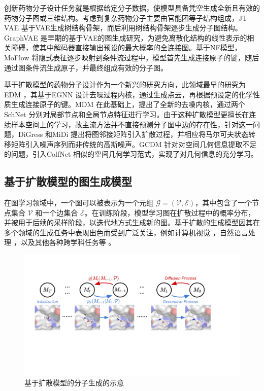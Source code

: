 创新药物分子设计任务就是根据给定分子数据，使模型具备凭空生成全新且有效的药物分子图或三维结构。考虑到复杂药物分子主要由官能团等子结构组成，JT-VAE \cite{jtvae_jin_18}基于VAE生成树结构骨架，而后利用树结构骨架逐步生成分子图结构。GraphVAE \cite{graphvae_simonovsky_18}是早期的基于VAE的图生成研究，为避免离散化结构的线性表示的相关障碍，使其中解码器直接输出预设的最大概率的全连接图。基于NF模型，MoFlow \cite{moflow_zang_20}将隐式表征逐步映射到条件流过程中，模型首先生成连接原子的键，随后通过图条件流生成原子，并最终组成有效的分子图。

基于扩散模型的药物分子设计作为一个新兴的研究方向，此领域最早的研究为EDM \cite{edm_hoogeboom_22}，其基于EGNN \cite{egnn_satorras_21}设计去噪过程内核，通过生成点云，再根据预设定的化学性质生成连接原子的键。MDM \cite{mdm_huang_23}在此基础上，提出了全新的去噪内核，通过两个SchNet \cite{schnet_schutt_17}分别对局部节点和全局节点特征进行学习。由于这种扩散模型更擅长在连续样本空间上的学习，故主流方法并不直接预测分子图中边的存在性，针对这一问题，DiGress \cite{digress_vignac_22}和MiDi \cite{midi_vignac_23}提出将图邻接矩阵引入扩散过程，并相应将马尔可夫状态转移矩阵引入噪声序列而非传统的高斯噪声。GCDM \cite{gcdm_morehead_23}针对对空间几何信息提取不足的问题，引入ColfNet \cite{colfnet_du_22}相似的空间几何学习范式，实现了对几何信息的充分学习。

\subsection{基于扩散模型的图生成模型}
在图学习领域中，一个图可以被表示为一个元组 $\mathcal{G} = (\mathcal{V}, \mathcal{E})$，其中包含了一个节点集合 $\mathcal{V}$ 和一个边集合 $\mathcal{E}$。在训练阶段，模型学习图在扩散过程中的概率分布，并被用于后续的采样阶段，以迭代地方式生成新的图。基于扩散的生成模型因其在多个领域的生成任务中表现出色而受到广泛关注，例如计算机视觉 \cite{blendeddiffusion_avrahami_22,cascadeddiff_ho_22,gradforshapegen_cai_20,sgmpointcloud_luo_21}，自然语言处理 \cite{struccddpm_austin_21,argmaxflow_hoogeboom_21,stepunrolled_savinov_22}，以及其他各种跨学科任务等 \cite{cdvae_xie_22,housediffusion_shabani_23,nap_lei_23}。

\begin{figure}[h]
  \centering
  \includegraphics[width=\linewidth]{figures/targetdiff.pdf}
  \caption{基于扩散模型的分子生成的示意 \cite{targetdiff_guan_23}}
  \label{fig:targetdiff}
\end{figure}

